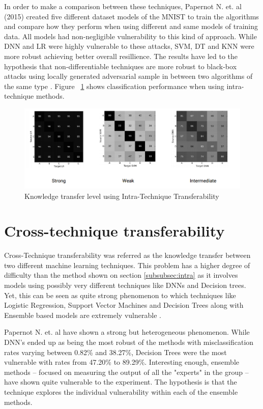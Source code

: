 In order to make a comparison between these techniques, Papernot N. et. al (2015) \cite{papernot2016transf} created five different dataset models of the MNIST to train the algorithms and compare how they perform when using different and same models of training data. All models had non-negligible vulnerability to this kind of approach. While DNN and LR were highly vulnerable to these attacks, SVM, DT and KNN were more robust achieving better overall resillience. The results have led to the hypothesis that non-differentiable techniques are more robust to black-box attacks using locally generated adversarial sample in between two algorithms of the same type \cite{papernot2016}. Figure ~\ref{fig:intra} shows classification performance when using intra-technique methods.

\begin{figure}[!h]
\centering
	\includegraphics[scale=0.6]{intra.png}
\caption{Knowledge transfer level using Intra-Technique Transferability \cite{papernot2016transf}}
\label{fig:intra}
\end{figure}


\section{Cross-technique transferability}
Cross-Technique transferability was referred as the knowledge transfer between two different machine learning techniques. This problem has a higher degree of difficulty than the method shown on section \ref{subsubsec:intra} as it involves models using possibly very different techniques like DNNs and Decision trees. Yet, this can be seen as quite strong phenomenon to which techniques like Logistic Regression, Support Vector Machines and Decision Trees along with Ensemble based models are extremely vulnerable \cite{papernot2016transf}.

Papernot N. et. al \cite{papernot2016transf} have shown a strong but heterogeneous phenomenon. While DNN's ended up as being the most robust of the methods with misclassification rates varying between 0.82\% and 38.27\%, Decision Trees were the most vulnerable with rates from 47.20\% to 89.29\%. Interesting enough, ensemble methods -- focused on measuring the output of all the "experts" in the group -- have shown quite vulnerable to the experiment. The hypothesis is that the technique explores the individual vulnerability within each of the ensemble methods.

